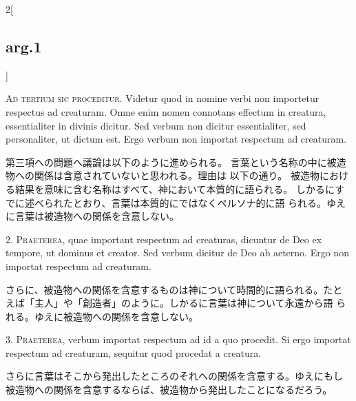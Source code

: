 \documentclass[paper=a4paper,fontsize=10pt,jafontsize=9pt,titlepage]{jlreq}
\begin{document}
{}
\setcounter{section}{3}
\setcounter{subsection}{0}

\begin{paracol}{2}[\subsection{arg.1}]

{\scshape Ad tertium sic proceditur}. Videtur quod in nomine verbi non importetur
respectus ad creaturam. Omne enim nomen connotans effectum in
creatura, essentialiter in divinis dicitur. Sed verbum non dicitur
essentialiter, sed personaliter, ut dictum est. Ergo verbum non
importat respectum ad creaturam.

\switchcolumn

第三項への問題へ議論は以下のように進められる。
言葉という名称の中に被造物への関係は含意されていないと思われる。理由は
 以下の通り。
被造物における結果を意味に含む名称はすべて、神において本質的に語られる。
 しかるにすでに述べられたとおり、言葉は本質的にではなくペルソナ的に語
 られる。ゆえに言葉は被造物への関係を含意しない。


2. {\scshape Praeterea}, quae important respectum ad creaturas, dicuntur de Deo ex
tempore, ut dominus et creator. Sed verbum dicitur de Deo ab
aeterno. Ergo non importat respectum ad creaturam.

\switchcolumn

さらに、被造物への関係を含意するものは神について時間的に語られる。たと
 えば「主人」や「創造者」のように。しかるに言葉は神について永遠から語
 られる。ゆえに被造物への関係を含意しない。


3. {\scshape Praeterea}, verbum importat respectum ad id a quo procedit. Si ergo
importat respectum ad creaturam, sequitur quod procedat a creatura.

\switchcolumn

さらに言葉はそこから発出したところのそれへの関係を含意する。ゆえにもし
 被造物への関係を含意するならば、被造物から発出したことになるだろう。


\end{paracol}
\end{document}
